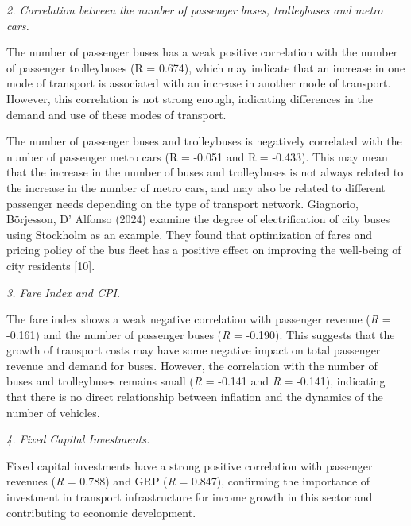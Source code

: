 \emph{2. Correlation between the number of passenger buses, trolleybuses
and metro cars.}

The number of passenger buses has a weak positive correlation with the
number of passenger trolleybuses (R = 0.674), which may indicate that an
increase in one mode of transport is associated with an increase in
another mode of transport. However, this correlation is not strong
enough, indicating differences in the demand and use of these modes of
transport.

The number of passenger buses and trolleybuses is negatively correlated
with the number of passenger metro cars (R = -0.051 and R = -0.433).
This may mean that the increase in the number of buses and trolleybuses
is not always related to the increase in the number of metro cars, and
may also be related to different passenger needs depending on the type
of transport network. Giagnorio, Börjesson, D' Alfonso
(2024) examine the degree of electrification of city buses using
Stockholm as an example. They found that optimization of fares and
pricing policy of the bus fleet has a positive effect on improving the
well-being of city residents {[}10{]}.

\emph{3. Fare Index and CPI.}

The fare index shows a weak negative correlation with passenger revenue
(\emph{R} = -0.161) and the number of passenger buses (\emph{R} =
-0.190). This suggests that the growth of transport costs may have some
negative impact on total passenger revenue and demand for buses.
However, the correlation with the number of buses and trolleybuses
remains small (\emph{R} = -0.141 and \emph{R} = -0.141), indicating that
there is no direct relationship between inflation and the dynamics of
the number of vehicles.

\emph{4. Fixed Capital Investments.}

Fixed capital investments have a strong positive correlation with
passenger revenues (\emph{R} = 0.788) and GRP (\emph{R} = 0.847),
confirming the importance of investment in transport infrastructure for
income growth in this sector and contributing to economic development.


